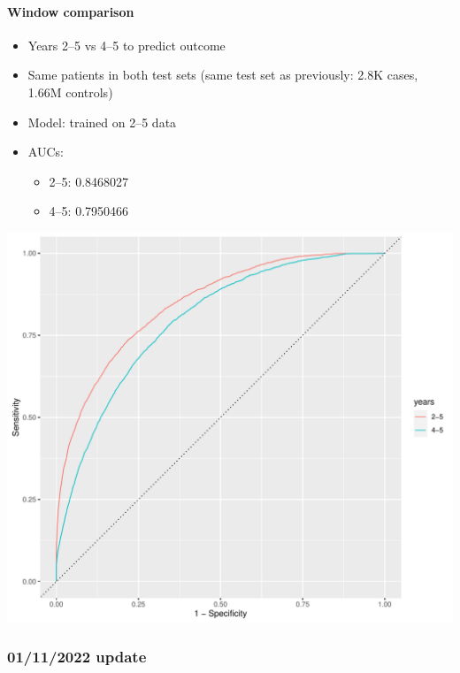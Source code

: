 \documentclass[12pt]{article}
\begin{document}
\newpage


\paragraph*{Window comparison}
\begin{itemize}
	\item Years 2--5 vs 4--5 to predict outcome
	\item Same patients in both test sets (same test set as previously: 2.8K cases, 1.66M controls)
	\item Model: trained on 2--5 data
	\item AUCs:
	\begin{itemize}
		\item 2--5: 0.8468027
		\item 4--5: 0.7950466
	\end{itemize}
\end{itemize}
\begin{center}
\includegraphics[width=\textwidth]{window_roc.pdf}
\end{center}





\pagebreak
\subsubsection*{01/11/2022 update}
\end{document}
